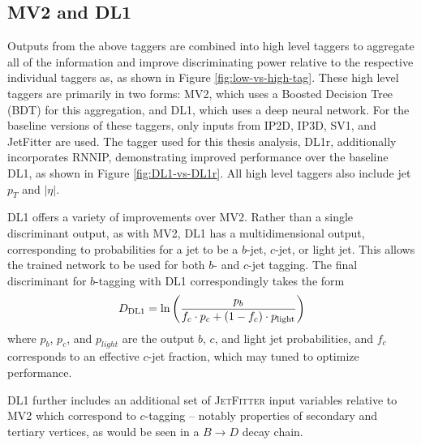 \subsection{MV2 and DL1}
Outputs from the above taggers are combined into high level taggers to aggregate all of the information and 
improve discriminating power relative to the respective individual taggers as, as shown in Figure 
\ref{fig:low-vs-high-tag}. These high level taggers are primarily in two forms: MV2, which uses a Boosted 
Decision Tree (BDT) for this aggregation, and DL1, which uses a deep neural network. For the baseline versions of 
these taggers, only inputs from IP2D, IP3D, SV1, and JetFitter are used. The tagger used for this thesis analysis, 
DL1r, additionally incorporates RNNIP, demonstrating improved performance over the baseline DL1, as shown in 
Figure \ref{fig:DL1-vs-DL1r}. All high level taggers also include jet $p_{T}$ and $|\eta|$.

DL1 offers a variety of improvements over MV2. Rather than a single discriminant output, 
as with MV2, DL1 has a multidimensional output, corresponding to probabilities for a jet to be a $b$-jet, $c$-jet, 
or light jet. This allows the trained network to be used for both $b$- and $c$-jet tagging. The final discriminant 
for $b$-tagging with DL1 correspondingly takes the form
\begin{equation}
D_{\text{DL1}} = \ln{\qty(\frac{p_{b}}{f_{c}\cdot p_c+(1-f_c)\cdot p_{\text{light}}})}
\end{equation}
where $p_b$, $p_c$, and $p_{light}$ are the output $b$, $c$, and light jet probabilities, and $f_{c}$
corresponds to an effective $c$-jet fraction, which may tuned to optimize performance.

DL1 further includes an additional set of \textsc{JetFitter}\xspace input variables relative to MV2 
which correspond to $c$-tagging -- notably properties of secondary and tertiary vertices, as would be 
seen in a $B\rightarrow D$ decay chain. 

